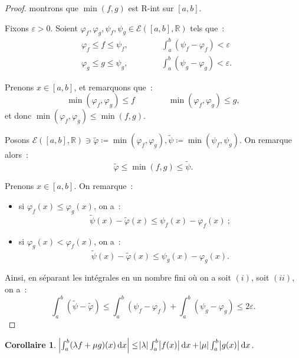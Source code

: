 \documentclass{report}
\newtheorem{cor}[thm]{Corollaire}
\theoremstyle{definition}
\theoremstyle{remark}
\numberwithin{equation}{section}
\newcommand{\R}{\mathbb R}
\newcommand{\El}[2]{\mathcal E\!\left(#1, #2\right)}
\begin{document}
			\begin{proof} montrons que $\min(f, g)$ est R-int sur $[a, b]$.

			Fixons $\varepsilon > 0$. Soient $\varphi_f, \varphi_g, \psi_f, \psi_g \in \El {[a, b]}\R$ tels que~:
			\begin{align}
				&\varphi_f \leq f \leq \psi_f, \qquad\qquad \int_a^b(\psi_f - \varphi_f) < \varepsilon \\
				&\varphi_g \leq g \leq \psi_g, \qquad\qquad \int_a^b(\psi_g - \varphi_g) < \varepsilon.
			\end{align}

			Prenons $x \in [a, b]$, et remarquons que~:
			\begin{equation}
				\min(\varphi_f, \varphi_g) \leq f\qquad\qquad\min(\varphi_f, \varphi_g) \leq g,
			\end{equation}
			et donc $\min(\varphi_f, \varphi_g) \leq \min(f, g)$.

			Posons $\El {[a, b]}\R \ni \widetilde \varphi \coloneqq \min(\varphi_f, \varphi_g), \widetilde \psi \coloneqq \min(\psi_f, \psi_g)$. On remarque alors~:
			\begin{equation}
				\widetilde \varphi \leq \min(f, g) \leq \widetilde \psi.
			\end{equation}

			Prenons $x \in [a, b]$. On remarque~:
			\begin{itemize}
				\item si $\varphi_f(x) \leq \varphi_g(x)$, on a~:
				\begin{equation}
					\widetilde \psi(x) - \widetilde \varphi(x) \leq \psi_f(x) - \varphi_f(x)~;
				\end{equation}
				\item si $\varphi_g(x) < \varphi_f(x)$, on a~:
				\begin{equation}
					\widetilde \psi(x) - \widetilde \varphi(x) \leq \psi_g(x) - \varphi_g(x).
				\end{equation}
			\end{itemize}

			Ainsi, en séparant les intégrales en un nombre fini où on a soit $(i)$, soit $(ii)$, on a~:
			\begin{equation}
				\int_a^b (\widetilde \psi - \widetilde \varphi) \leq \int_a^b (\psi_f - \varphi_f) + \int_a^b (\psi_g - \varphi_g) \leq 2\varepsilon.
			\end{equation}
			\end{proof}

			\begin{cor} $\abs {\int_a^b (\lambda f + \mu g)(x)\dif x} \leq \abs \lambda \int_a^b \abs {f(x)}\dif x + \abs \mu \int_a^b\abs {g(x)}\dif x$.
			\end{cor}
\end{document}
